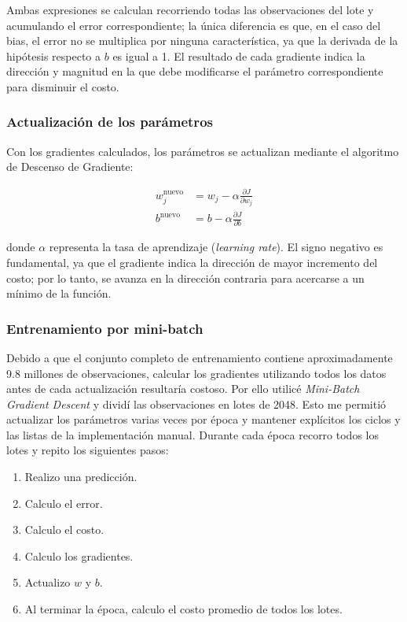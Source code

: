 \documentclass[a4paper,12pt,twocolumn]{report}
\begin{document}
Ambas expresiones se calculan recorriendo todas las observaciones del lote y acumulando el error correspondiente; la única diferencia es que, en el caso del bias, el error no se multiplica por ninguna característica, ya que la derivada de la hipótesis respecto a $b$ es igual a 1. El resultado de cada gradiente indica la dirección y magnitud en la que debe modificarse el parámetro correspondiente para disminuir el costo.

\subsubsection{Actualización de los parámetros}

Con los gradientes calculados, los parámetros se actualizan mediante el algoritmo de Descenso de Gradiente:

\begin{align}
w_j^{\text{nuevo}} &= w_j - \alpha \frac{\partial J}{\partial w_j} \\
b^{\text{nuevo}} &= b - \alpha \frac{\partial J}{\partial b}
\end{align}

donde $\alpha$ representa la tasa de aprendizaje (\textit{learning rate}). El signo negativo es fundamental, ya que el gradiente indica la dirección de mayor incremento del costo; por lo tanto, se avanza en la dirección contraria para acercarse a un mínimo de la función.

\subsubsection{Entrenamiento por mini-batch}

Debido a que el conjunto completo de entrenamiento contiene aproximadamente 9.8 millones de observaciones, calcular los gradientes utilizando todos los datos antes de cada actualización resultaría costoso. Por ello utilicé \textit{Mini-Batch Gradient Descent} y dividí las observaciones en lotes de 2048. Esto me permitió actualizar los parámetros varias veces por época y mantener explícitos los ciclos y las listas de la implementación manual.
\newline
Durante cada época recorro todos los lotes y repito los siguientes pasos:

\begin{enumerate}
	\item Realizo una predicción.
	\item Calculo el error.
	\item Calculo el costo.
	\item Calculo los gradientes.
	\item Actualizo $w$ y $b$.
	\item Al terminar la época, calculo el costo promedio de todos los lotes.
\end{enumerate}
\end{document}
